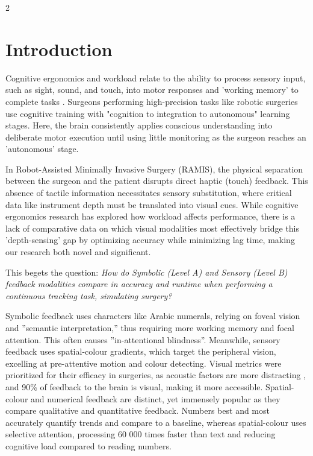 \documentclass[a4paper,12pt]{article}
\begin{document}
\clearpage
\begin{multicols}{2} 

\section{Introduction}

Cognitive ergonomics and workload relate to the ability to process sensory input, such as sight, sound, and touch, into motor responses and 'working memory' to complete tasks \cite {shingwaiwong_2024_cognitive}. Surgeons performing high-precision tasks like robotic surgeries use cognitive training with "cognition to integration to autonomous" learning stages. Here, the brain consistently applies conscious understanding into deliberate motor execution until using little monitoring as the surgeon reaches an 'autonomous' stage\cite{motorlearning}. 

In Robot-Assisted Minimally Invasive Surgery (RAMIS), the physical separation between the surgeon and the patient disrupts direct haptic (touch) feedback\cite{friebe_2025_palpation}. This absence of tactile information necessitates sensory substitution, where critical data like instrument depth must be translated into visual cues. While cognitive ergonomics research has explored how workload affects performance, there is a lack of comparative data on which visual modalities most effectively bridge this 'depth-sensing' gap \cite{kitagawa_2005_effect,liu_2021_a} by optimizing accuracy while minimizing lag time, making our research both novel and significant. 

This begets the question:  \textit{How do Symbolic (Level A) and Sensory (Level B) feedback modalities compare in accuracy and runtime when performing a continuous tracking task, simulating surgery?}

Symbolic feedback uses characters like Arabic numerals, relying on foveal vision and ”semantic interpretation,” thus requiring more working memory and focal attention. This often causes ”in-attentional blindness”\cite{cai_2022_attention, estudillo_2025_exploring}. Meanwhile, sensory feedback uses spatial-colour gradients, which target the peripheral vision, excelling at pre-attentive motion and colour detecting\cite{interactiondesignfoundation_2019_preattentive}. Visual metrics were prioritized for their efficacy in surgeries, as acoustic factors are more distracting \cite{distraction}, and  90\% of feedback to the brain is visual\cite{90brain}, making it more accessible. Spatial-colour and numerical feedback are distinct, yet immensely popular as they compare qualitative and quantitative feedback\cite{quantvqual,subjective}. Numbers best and most accurately quantify trends and compare to a baseline, whereas spatial-colour uses selective attention, processing 60 000 times faster than text and reducing cognitive load compared to reading numbers\cite{90brain}.


\end{multicols}
\end{document}
